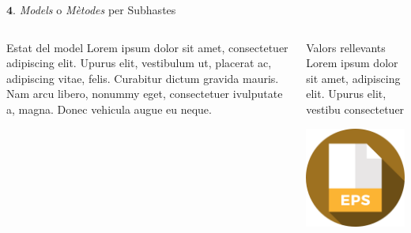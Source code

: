 \documentclass[twocolumn]{beamer}
\begin{document}
\begin{frame}{$\mathbf 4.$ \textit{Models} o \textit{Mètodes} per Subhastes}
\begin{columns}[t]
	\begin{column}{.5\textwidth}
		\begin{block}{Estat del model}
			Lorem ipsum dolor sit amet,
			consectetuer adipiscing elit. Upurus elit, vestibulum ut,
			placerat ac, adipiscing vitae,
			felis. Curabitur dictum gravida
			mauris. Nam arcu libero,
			nonummy eget, consectetuer ivulputate a, magna. Donec
			vehicula augue eu neque.
		\end{block}
	\end{column}
	\begin{column}{.5\textwidth}
		\begin{block}{Valors rellevants}
			Lorem ipsum dolor sit amet,
			adipiscing elit. Upurus elit, vestibu
			consectetuer 
		\end{block}
		\includegraphics[width=3.5cm]{eps}
	\end{column}
\end{columns}
\end{frame}
\end{document}
